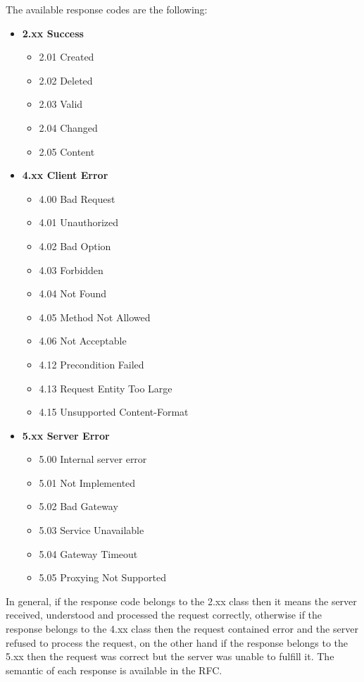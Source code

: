 	The available response codes are the following:
	\begin{itemize}
		\item \textbf{2.xx Success}
		\begin{itemize}
			\item 2.01 Created
			\item 2.02 Deleted
			\item 2.03 Valid
			\item 2.04 Changed
			\item 2.05 Content
		\end{itemize}
		
		\item \textbf{4.xx Client Error}
		\begin{itemize}
			\item 4.00 Bad Request
			\item 4.01 Unauthorized
			\item 4.02 Bad Option
			\item 4.03 Forbidden
			\item 4.04 Not Found
			\item 4.05 Method Not Allowed
			\item 4.06 Not Acceptable
			\item 4.12 Precondition Failed
			\item 4.13  Request Entity Too Large
			\item 4.15 Unsupported Content-Format
		\end{itemize}		
		
		\item \textbf{5.xx Server Error}
		\begin{itemize}
			\item 5.00 Internal server error
			\item 5.01 Not Implemented
			\item 5.02 Bad Gateway
			\item 5.03 Service Unavailable
			\item 5.04 Gateway Timeout
			\item 5.05 Proxying Not Supported
		\end{itemize}
	\end{itemize}
	
	In general, if the response code belongs to the 2.xx class then it means the server received, understood and processed the request correctly, otherwise if the response belongs to the 4.xx class then the request contained error and the server refused to process the request, on the other hand if the response belongs to the 5.xx then the request was correct but the server was unable to fulfill it.\newline
	The semantic of each response is available in the RFC.\newline
	
